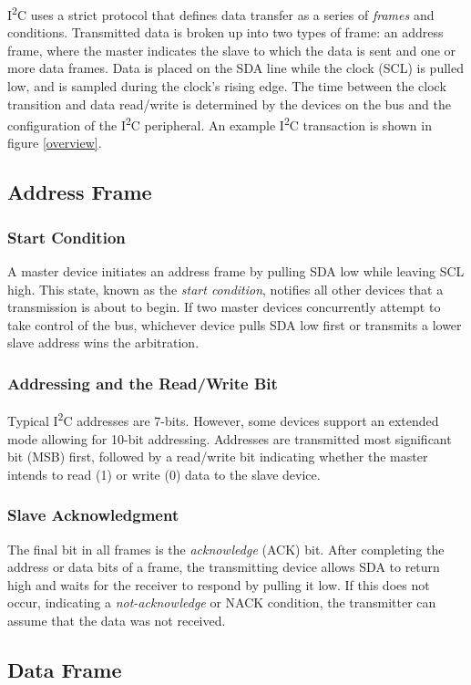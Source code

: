 \documentclass[openany,11pt,fleqn]{book} %
\begin{document}
    I\textsuperscript{2}C uses a strict protocol that defines data transfer as a series of \textit{frames} and conditions.     
    Transmitted data is broken up into two types of frame: an address frame, where the master indicates the slave to which the data is sent and one or more data frames. Data is placed on the SDA line while the clock (SCL) is pulled low, and is sampled during the clock's rising edge. The time between the clock transition and data read/write is determined by the devices on the bus and the configuration of the I\textsuperscript{2}C peripheral. An example I\textsuperscript{2}C transaction is shown in figure \ref{overview}. 
    
    \subsection{Address Frame}
        \subsubsection{Start Condition}
        A master device initiates an address frame by pulling SDA low while leaving SCL high. This state, known as the \textit{start condition}, notifies all other devices that a transmission is about to begin. If two master devices concurrently attempt to take control of the bus, whichever device pulls SDA low first or transmits a lower slave address  wins the arbitration. 
        \subsubsection{Addressing and the Read/Write Bit}
        Typical I\textsuperscript{2}C addresses are 7-bits. However, some devices support an extended mode allowing for 10-bit addressing. Addresses are transmitted most significant bit (MSB) first, followed by a read/write bit indicating whether the master intends to read (1) or write (0) data to the slave device. 
        \subsubsection{Slave Acknowledgment}
        The final bit in all frames is the \textit{acknowledge} (ACK) bit. After completing the address or data bits of a frame, the transmitting device allows SDA to return high and waits for the receiver to respond by pulling it low. If this does not occur, indicating a \textit{not-acknowledge} or NACK condition, the transmitter can assume that the data was not received. 
    \subsection{Data Frame}
\end{document}
